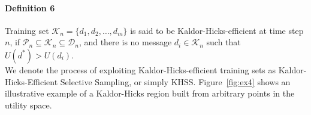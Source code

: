 \documentclass{sig-alternate}
\begin{document}

\paragraph*{\bf{Definition 6}} Training set $\mathcal{K}_n=\{d_1, d_2, \ldots, d_m\}$ is said to be Kaldor-Hicks-efficient at time step $n$, if $\mathcal{P}_n\subseteq\mathcal{K}_n\subseteq\mathcal{D}_n$, and there is no message $d_i\in\mathcal{K}_n$ such that $U(d^*)>U(d_i)$.\\

We denote the process of exploiting Kaldor-Hicks-efficient training sets as
Kaldor-Hicks-Efficient Selective Sampling, or simply KHSS. Figure~\ref{fig:ex4} shows an illustrative example of a Kaldor-Hicks region built from arbitrary points in the utility space.

%
%
\end{document}
